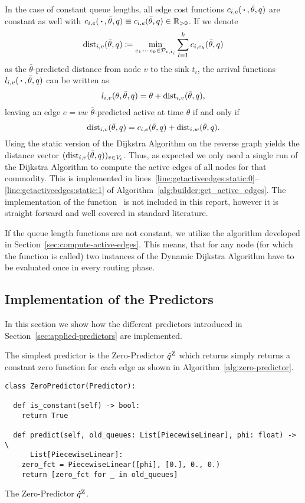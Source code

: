 In the case of constant queue lengths, all edge cost functions $c_{i,e}(\,\boldsymbol{\cdot}\,,\bar\theta,q)$ are constant as well with $c_{i,e}(\,\boldsymbol{\cdot}\,,\bar\theta,q)\equiv c_{i,e}(\bar\theta,q) \in \mathbb{R}_{>0}$.
If we denote \[
  \textrm{dist}_{i,v}(\bar\theta, q)\coloneqq \min_{e_1\,\cdots\,e_k\in\mathcal{P}_{v,t_i}} \sum_{l=1}^k c_{i,e_k}(\bar\theta, q)
\]
as the $\bar\theta$-predicted distance from node $v$ to the sink $t_i$, the arrival functions $l_{i,v}(\,\boldsymbol{\cdot}\,, \bar\theta, q)$ can be written as \[
  l_{i,v}(\theta, \bar\theta, q) = \theta + \textrm{dist}_{i,v}(\bar\theta, q),
\]
leaving an edge $e=vw$ $\bar\theta$-predicted active at time $\theta$ if and only if \[
  \textrm{dist}_{i,v}(\bar\theta, q) = c_{i,e}(\bar\theta, q) + \textrm{dist}_{i,w}(\bar\theta, q).
\]
Using the static version of the Dijkstra Algorithm on the reverse graph yields the distance vector $(\textrm{dist}_{i,v}(\bar\theta, q))_{v\in V_i}$.
Thus, as expected we only need a single run of the Dijkstra Algorithm to compute the active edges of all nodes for that commodity.
This is implemented in lines~\ref{line:getactiveedges:static:0}--\ref{line:getactiveedges:static:1} of Algorithm~\ref{alg:builder:get_active_edges}.
The implementation of the function~ is not included in this report, however it is straight forward and well covered in standard literature.  

If the queue length functions are not constant, we utilize the algorithm developed in Section~\ref{sec:compute-active-edges}.
This means, that for any node (for which the function  is called) two instances of the Dynamic Dijkstra Algorithm have to be evaluated once in every routing phase. 


\subsection{Implementation of the Predictors}\label{subsec:implementation-predictors}

In this section we show how the different predictors introduced in Section~\ref{sec:applied-predictors} are implemented.


The simplest predictor is the Zero-Predictor $\hat q^{\text{Z}}$ which returns simply returns a constant zero function for each edge as shown in Algorithm~\ref{alg:zero-predictor}.

\begin{algorithm}[H]
  \begin{verbatim}
class ZeroPredictor(Predictor):

  def is_constant(self) -> bool:
    return True

  def predict(self, old_queues: List[PiecewiseLinear], phi: float) -> \
      List[PiecewiseLinear]:
    zero_fct = PiecewiseLinear([phi], [0.], 0., 0.)
    return [zero_fct for _ in old_queues]
\end{verbatim}
\caption{The Zero-Predictor $\hat q^{\text{Z}}$.}
\label{alg:zero-predictor}
\end{algorithm}

